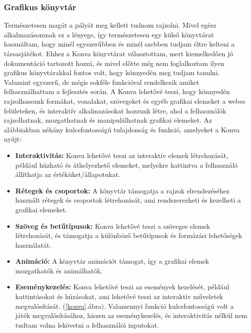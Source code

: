 \documentclass[a4paper,twoside]{article}
\begin{document}
\subsubsection{Grafikus könyvtár}
Természetesen magát a pályát meg kellett tudnom rajzolni. Mivel egész alkalmazásomnak ez a lényege, így természetesen egy külső könyvtárat használtam, hogy minél egyszerűbben és minél szebben tudjam éltre kelteni a társasjátékot. Ehhez a Konva könyvtárat választottam, mert kiemelkedően jó dokumentáció tartozott hozzá, és mivel előtte még nem foglalkoztam ilyen grafikus könyvtárakkal fontos volt, hogy könnyedén meg tudjam tanulni. Valamint egyszerű, de mégis sokféle funkcióval rendelkezik amiket felhasználhattam a fejlesztés során. 
A Konva lehetővé teszi, hogy könnyedén rajzolhassunk formákat, vonalakat, szövegeket és egyéb grafikai elemeket a webes felületeken, és interaktív alkalmazásokat hozzunk létre, ahol a felhasználók rajzolhatnak, mozgathatnak és manipulálhatnak grafikai elemeket. Az alábbiakban néhány kulcsfontosságú tulajdonság és funkció, amelyeket a Konva nyújt:
\begin{itemize}
	\item \textbf{Interaktivitás:} Konva lehetővé teszi az interaktív elemek létrehozását, például húzható és áthelyezhető elemeket, melyekre kattintva a felhasználó állíthatja az értéküket/állapotukat. 
	\item \textbf{Rétegek és csoportok:} A könyvtár támogatja a rajzok elrendezéséhez használt rétegek és csoportok létrehozását, ami rendszerezheti és kezelheti a grafikai elemeket.
	\item \textbf{Szöveg és betűtípusok:} Konva lehetővé teszi a szöveges elemek létrehozását, és támogatja a különböző betűtípusok és formázási lehetőségek használatát.
	\item \textbf{Animáció:} A könyvtár animációt támogat, így a grafikai elemek mozgathatók és animálhatók.
	\item \textbf{Eseménykezelés:} Konva lehetővé teszi az események kezelését, például kattintásokat és húzásokat, ami lehetővé teszi az interaktív műveletek megvalósítását. (\ref{konva}.ábra).
	Valamennyi funkció kulcsfontosságú volt a játék megvalósításához, hiszen az eseménykezelés, és interaktivitás nélkül nem tudtam volna lekövetni a felhasználói inputokat.  
\end{itemize}
\end{document}
